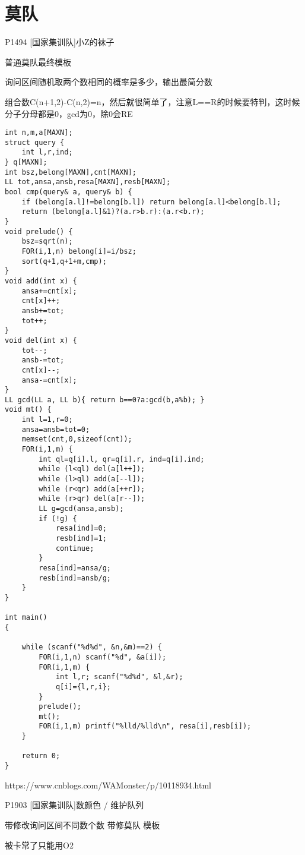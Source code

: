 \section{莫队}

P1494 [国家集训队]小Z的袜子

普通莫队最终模板

询问区间随机取两个数相同的概率是多少，输出最简分数

组合数C(n+1,2)-C(n,2)=n，然后就很简单了，注意L==R的时候要特判，这时候分子分母都是0，gcd为0，除0会RE

\begin{lstlisting}
int n,m,a[MAXN];
struct query {
    int l,r,ind;
} q[MAXN];
int bsz,belong[MAXN],cnt[MAXN];
LL tot,ansa,ansb,resa[MAXN],resb[MAXN];
bool cmp(query& a, query& b) {
    if (belong[a.l]!=belong[b.l]) return belong[a.l]<belong[b.l];
    return (belong[a.l]&1)?(a.r>b.r):(a.r<b.r);
}
void prelude() {
    bsz=sqrt(n);
    FOR(i,1,n) belong[i]=i/bsz;
    sort(q+1,q+1+m,cmp);
}
void add(int x) {
    ansa+=cnt[x];
    cnt[x]++;
    ansb+=tot;
    tot++;
}
void del(int x) {
    tot--;
    ansb-=tot;
    cnt[x]--;
    ansa-=cnt[x];
}
LL gcd(LL a, LL b){ return b==0?a:gcd(b,a%b); }
void mt() {
    int l=1,r=0;
    ansa=ansb=tot=0;
    memset(cnt,0,sizeof(cnt));
    FOR(i,1,m) {
        int ql=q[i].l, qr=q[i].r, ind=q[i].ind;
        while (l<ql) del(a[l++]);
        while (l>ql) add(a[--l]);
        while (r<qr) add(a[++r]);
        while (r>qr) del(a[r--]);
        LL g=gcd(ansa,ansb);
        if (!g) {
            resa[ind]=0;
            resb[ind]=1;
            continue;
        }
        resa[ind]=ansa/g;
        resb[ind]=ansb/g;
    }
}

int main()
{

    while (scanf("%d%d", &n,&m)==2) {
        FOR(i,1,n) scanf("%d", &a[i]);
        FOR(i,1,m) {
            int l,r; scanf("%d%d", &l,&r);
            q[i]={l,r,i};
        }
        prelude();
        mt();
        FOR(i,1,m) printf("%lld/%lld\n", resa[i],resb[i]);
    }

    return 0;
}
\end{lstlisting}

https://www.cnblogs.com/WAMonster/p/10118934.html

P1903 [国家集训队]数颜色 / 维护队列

带修改询问区间不同数个数 带修莫队 模板

被卡常了只能用O2


